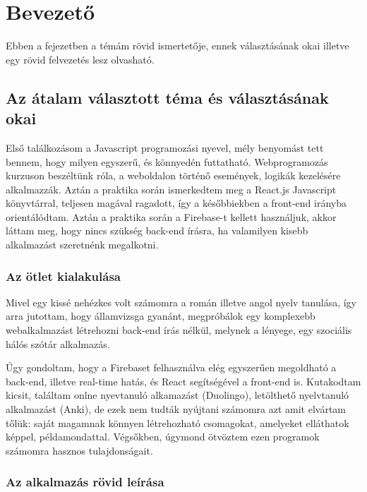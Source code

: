 \chapter{Bevezető}\label{ch:BEVEZET}

\begin{osszefoglal}
Ebben a fejezetben a témám rövid ismertetője, ennek választásának okai illetve egy rövid felvezetés lesz olvasható.
\end{osszefoglal}

\section{Az átalam választott téma és választásának okai}\label{sec:BEVEZET:temaoka}

Első találkozásom a Javascript programozási nyevel, mély benyomást tett bennem, hogy milyen egyszerű, és könnyedén futtatható. Webprogramozás kurzuson beszéltünk róla, a weboldalon történő események, logikák kezelésére alkalmazzák. Aztán a praktika során ismerkedtem meg a React.js Javascript könyvtárral, teljesen magával ragadott, így a későbbiekben a front-end irányba orientálódtam.
Aztán a praktika során a Firebase-t kellett használjuk, akkor láttam meg, hogy nincs szükség back-end írásra, ha valamilyen kisebb alkalmazást szeretnénk megalkotni. 

\subsection{Az ötlet kialakulása}\label{subsec:BEVEZET:temaoka:kialakulas}

Mivel egy kissé nehézkes volt számomra a román illetve angol nyelv tanulása, így arra jutottam, hogy államvizsga gyanánt, megpróbálok egy komplexebb webalkalmazást létrehozni back-end írás nélkül, melynek a lényege, egy szociális hálós szótár alkalmazás.

Úgy gondoltam, hogy a Firebaset felhasználva elég egyszerűen megoldható a back-end, illetve real-time hatás, és React segítségével a front-end is. Kutakodtam kicsit, találtam onlne nyevtanuló alkamazást (Duolingo), letölthető nyelvtanuló alkalmazást (Anki), de ezek nem tudták nyújtani számomra azt amit elvártam tőlük: saját magamnak könnyen létrehozható csomagokat, amelyeket elláthatok képpel, példamondattal. Végsőkben, úgymond ötvöztem ezen programok számomra hasznos tulajdonságait.

\subsection{Az alkalmazás rövid leírása}\label{sec:BEVEZET:felvezet}

